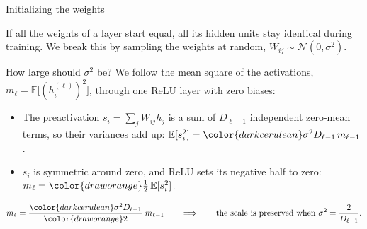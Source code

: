 \begin{frame}{Initializing the weights}
	\MLPTrainingFont
	\setlength{\abovedisplayskip}{4pt}\setlength{\belowdisplayskip}{4pt}
	\begin{tcolorbox}[nndsorange,boxsep=1mm,top=1mm,bottom=1mm]
		If all the weights of a layer start equal, all its hidden units stay identical during training. We break this  by sampling the weights at random, $W_{ij}\sim\mathcal{N}(0,\sigma^2)$.
	\end{tcolorbox}

	How large should $\sigma^2$ be? We follow the mean square of the activations, $m_\ell=\mathbb{E}\bigl[(h^{(\ell)}_i)^2\bigr]$, through one ReLU layer with zero biases:
	\begin{itemize}
		\item The preactivation $s_i=\sum_{j}W_{ij}h_j$ is a sum of $D_{\ell-1}$ independent zero-mean terms, so their variances add up: $\mathbb{E}[s_i^2]={\color{darkcerulean}\sigma^2 D_{\ell-1}}\,m_{\ell-1}$.
		\item $s_i$ is symmetric around zero, and ReLU sets its negative half to zero: $m_\ell={\color{draworange}\tfrac12}\,\mathbb{E}[s_i^2]$.
	\end{itemize}

	\begin{tcolorbox}[nndsgreen,boxsep=1mm,top=1mm,bottom=1mm]
		\[
			m_\ell=\frac{{\color{darkcerulean}\sigma^2 D_{\ell-1}}}{{\color{draworange}2}}\;m_{\ell-1}
			\qquad\Longrightarrow\qquad
			\text{the scale is preserved when }\sigma^2=\frac{2}{D_{\ell-1}}.
		\]
	\end{tcolorbox}
\end{frame}

